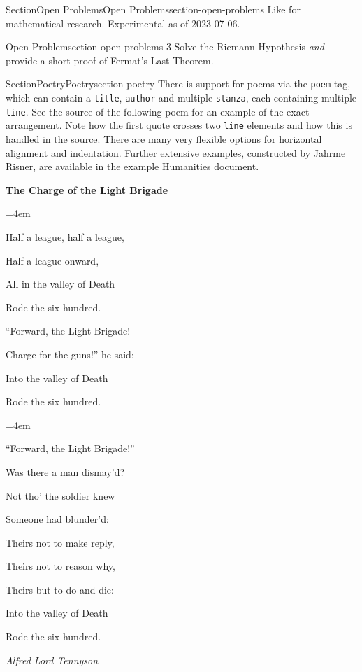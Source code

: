 \documentclass[twoside,10pt,]{article}
\newcommand{\mono}[1]{\texttt{#1}}
\numberwithin{equation}{section}
\newenvironment{poem}{\setlength{\parindent}{0em}}{}
\newcommand{\poemTitle}[1]{\begin{center}\large\textbf{#1}\end{center}}
\newenvironment{stanza}{\vspace{0.25 em}\hangindent=4em}{\vspace{1 em}}
\newcommand{\poemauthorleft}[1]{\vspace{-1em}\begin{flushleft}\textit{#1}\end{flushleft}}
\newcommand{\poemlineleft}[1]{{\raggedright{#1}\par}\vspace{-\parskip}}
\begin{document}
\begin{sectionptx}{Section}{Open Problems}{}{Open Problems}{}{}{section-open-problems}
Like for mathematical research.  Experimental as of 2023-07-06.%
\begin{openproblem}{Open Problem}{}{section-open-problems-3}%
Solve the Riemann Hypothesis\footnotemark{} \emph{and} provide a short proof of Fermat's Last Theorem.%
\end{openproblem}
%
\end{sectionptx}
%
%
\typeout{************************************************}
\typeout{************************************************}
%
\begin{sectionptx}{Section}{Poetry}{}{Poetry}{}{}{section-poetry}
There is support for poems via the \mono{poem} tag, which can contain a \mono{title}, \mono{author} and multiple \mono{stanza}, each containing multiple \mono{line}.  See the source of the following poem for an example of the exact arrangement.  Note how the first quote crosses two \mono{line} elements and how this is handled in the source.  There are many very flexible options for horizontal alignment and indentation.  Further extensive examples, constructed by Jahrme Risner, are available in the example Humanities document.%
\begin{poem}\label{poem-light-brigade}%
\poemTitle{The Charge of the Light Brigade}
%
\begin{stanza}
\poemlineleft{Half a league, half a league,}
\poemlineleft{Half a league onward,}
\poemlineleft{All in the valley of Death}
\poemlineleft{Rode the six hundred.}
\poemlineleft{``Forward, the Light Brigade!}
\poemlineleft{Charge for the guns!'' he said:}
\poemlineleft{Into the valley of Death}
\poemlineleft{Rode the six hundred.}
\end{stanza}
\begin{stanza}
%
\poemlineleft{``Forward, the Light Brigade!''}
\poemlineleft{Was there a man dismay'd?}
\poemlineleft{Not tho' the soldier knew}
\poemlineleft{Someone had blunder'd:}
\poemlineleft{Theirs not to make reply,}
\poemlineleft{Theirs not to reason why,}
\poemlineleft{Theirs but to do and die:}
\poemlineleft{Into the valley of Death}
\poemlineleft{Rode the six hundred.}
\end{stanza}
\poemauthorleft{Alfred Lord Tennyson}
\end{poem}

\end{sectionptx}
\end{document}
